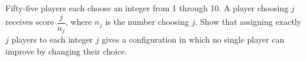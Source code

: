 Fifty-five players each choose an integer from 1 through 10. A player choosing $ j $ receives score $\dfrac{j}{n_j}$, where $ n_j $ is the number choosing $ j $. Show that assigning exactly $ j $ players to each integer $ j $ gives a configuration in which no single player can improve by changing their choice.

